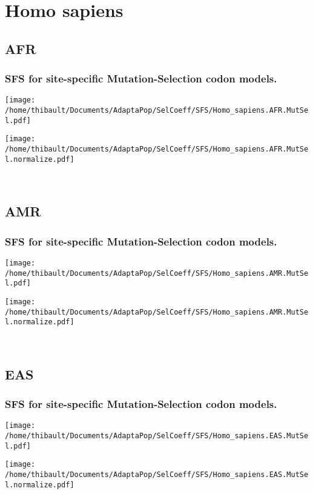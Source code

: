 \section{Homo sapiens} 
 
\subsection{AFR} 
 
\subsubsection*{SFS for site-specific Mutation-Selection codon models.} 
\begin{minipage}{0.49\linewidth} 
\texttt{[image: /home/thibault/Documents/AdaptaPop/SelCoeff/SFS/Homo\_sapiens.AFR.MutSel.pdf]} 
\end{minipage}
\begin{minipage}{0.49\linewidth}
\texttt{[image: /home/thibault/Documents/AdaptaPop/SelCoeff/SFS/Homo\_sapiens.AFR.MutSel.normalize.pdf]} 
\end{minipage}
\\ 
\subsection{AMR} 
 
\subsubsection*{SFS for site-specific Mutation-Selection codon models.} 
\begin{minipage}{0.49\linewidth} 
\texttt{[image: /home/thibault/Documents/AdaptaPop/SelCoeff/SFS/Homo\_sapiens.AMR.MutSel.pdf]} 
\end{minipage}
\begin{minipage}{0.49\linewidth}
\texttt{[image: /home/thibault/Documents/AdaptaPop/SelCoeff/SFS/Homo\_sapiens.AMR.MutSel.normalize.pdf]} 
\end{minipage}
\\ 
\subsection{EAS} 
 
\subsubsection*{SFS for site-specific Mutation-Selection codon models.} 
\begin{minipage}{0.49\linewidth} 
\texttt{[image: /home/thibault/Documents/AdaptaPop/SelCoeff/SFS/Homo\_sapiens.EAS.MutSel.pdf]} 
\end{minipage}
\begin{minipage}{0.49\linewidth}
\texttt{[image: /home/thibault/Documents/AdaptaPop/SelCoeff/SFS/Homo\_sapiens.EAS.MutSel.normalize.pdf]} 
\end{minipage}
\\ 
